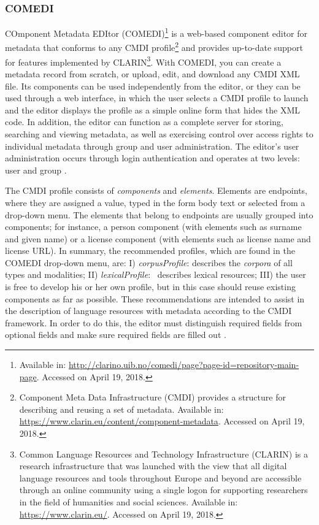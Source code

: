 \documentclass[english]{textolivre}
\begin{document}
\subsubsection{COMEDI}\label{sec-resumo}
COmponent Metadata EDItor (COMEDI)\footnote{Available in: \url{http://clarino.uib.no/comedi/page?page-id=repository-main-page}. Accessed on April 19, 2018.} is a web-based component editor for metadata that conforms to any CMDI profile\footnote{Component Meta Data Infrastructure (CMDI) provides a structure for describing and reusing a set of metadata. Available in: \url{https://www.clarin.eu/content/component-metadata}. Accessed on April 19, 2018.} and provides up-to-date support for features implemented by CLARIN\footnote{Common Language Resources and Technology Infrastructure (CLARIN) is a research infrastructure that was launched with the view that all digital language resources and tools throughout Europe and beyond are accessible through an online community using a single logon for supporting researchers in the field of humanities and social sciences. Available in: \url{https://www.clarin.eu/}. Accessed on April 19, 2018.}. With COMEDI, you can create a metadata record from scratch, or upload, edit, and download any CMDI XML file. Its components can be used independently from the editor, or they can be used through a web interface, in which the user selects a CMDI profile to launch and the editor displays the profile as a simple online form that hides the XML code. In addition, the editor can function as a complete server for storing, searching and viewing metadata, as well as exercising control over access rights to individual metadata through group and user administration. The editor’s user administration occurs through login authentication and operates at two levels: user and group \cite{lyse_comedi:_2015}.

The CMDI profile consists of \textit{components} and \textit{elements}. Elements are endpoints, where they are assigned a value, typed in the form body text or selected from a drop-down menu. The elements that belong to endpoints are usually grouped into components; for instance, a person component (with elements such as surname and given name) or a license component (with elements such as license name and license URL). In summary, the recommended profiles, which are found in the COMEDI drop-down menu, are: I) \textit{corpusProfile}: describes the \textit{corpora} of all types and modalities; II) \textit{lexicalProfile}:  describes lexical resources; III) the user is free to develop his or her own profile, but in this case should reuse existing components as far as possible. These recommendations are intended to assist in the description of language resources with metadata according to the CMDI framework. In order to do this, the editor must distinguish required fields from optional fields and make sure required fields are filled out \cite{dima_metadata_2012}.
\end{document}

